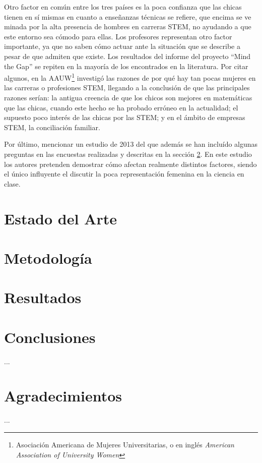 \documentclass[runningheads,a4paper]{llncs}
\begin{document}
Otro factor en común entre los tres países es la poca confianza que las chicas tienen en sí mismas en cuanto a enseñanzas técnicas se refiere, que encima se ve minada por la alta presencia de hombres en carreras STEM, no ayudando a que este entorno sea cómodo para ellas. Los profesores representan otro factor importante, ya que no saben cómo actuar ante la situación que se describe a pesar de que admiten que existe.
Los resultados del informe del proyecto ``Mind the Gap'' se repiten en la mayoría de los encontrados en la literatura. Por citar algunos, en \cite{hill2010so} la AAUW\footnote{Asociación Americana de Mujeres Universitarias, o en inglés \textit{American Association of University Women}} investigó las razones de por qué hay tan pocas mujeres en las carreras o profesiones STEM, llegando a la conclusión de que las principales razones serían: la antigua creencia de que los chicos son mejores en matemáticas que las chicas, cuando este hecho se ha probado erróneo en la actualidad; el supuesto poco interés de las chicas por las STEM; y en el ámbito de empresas STEM, la conciliación familiar. 

Por último, mencionar un estudio de 2013 \cite{hazari2013factors} del que además se han incluído algunas preguntas en las encuestas realizadas y descritas en la sección \ref{sec:metodologia}. En este estudio los autores pretenden demostrar cómo afectan realmente distintos factores, siendo el único influyente el discutir la poca representación femenina en la ciencia en clase.

\section{Estado del Arte}
\label{sec:EdA}

\section{Metodología}
\label{sec:metodologia}

\section{Resultados}
\label{sec:resultados}

\section{Conclusiones}
\label{sec:conclusiones}

...


\section*{Agradecimientos} 

...


%




\end{document}
